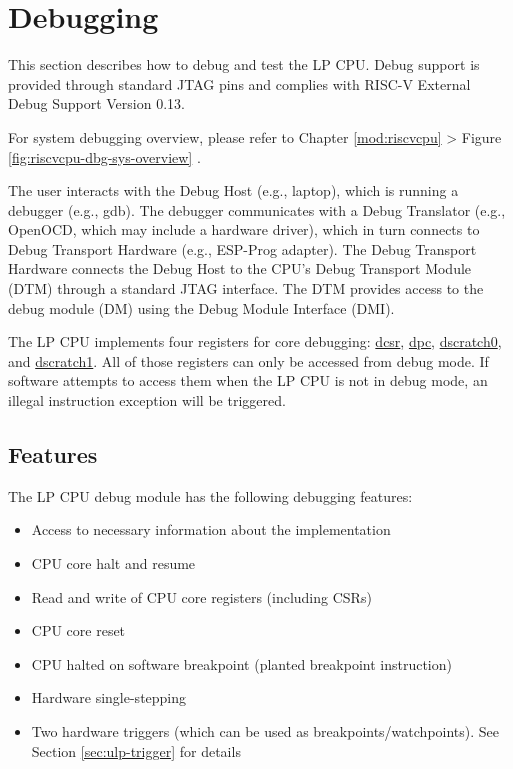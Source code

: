 \documentclass[main\_\_EN.tex]{subfiles}
\begin{document}
\section{Debugging}

This section describes how to debug and test the LP CPU. Debug support is provided through standard JTAG pins and complies with RISC-V External Debug Support Version 0.13.

For \chipname{} system debugging overview, please refer to Chapter \ref{mod:riscvcpu} \textit{} > Figure \ref{fig:riscvcpu-dbg-sys-overview} \textit{}.

The user interacts with the Debug Host (e.g., laptop), which is running a debugger (e.g., gdb). The debugger communicates with a Debug Translator (e.g., OpenOCD, which may include a hardware driver), which in turn connects to Debug Transport Hardware (e.g., ESP-Prog adapter). The Debug Transport Hardware connects the Debug Host to the CPU's Debug Transport Module (DTM) through a standard JTAG interface. The DTM provides access to the debug module (DM) using the Debug Module Interface (DMI).

The LP CPU implements four registers for core debugging: \hyperref[regdesc:LPDCSR]{dcsr}, \hyperref[regdesc:LPDPC]{dpc}, \hyperref[regdesc:LPDSCRATCH0]{dscratch0}, and \hyperref[regdesc:LPDSCRATCH1]{dscratch1}. All of those registers can only be accessed from debug mode. If software attempts to access them when the LP CPU is not in debug mode, an illegal instruction exception will be triggered.

\subsection{Features}
The LP CPU debug module has the following debugging features:
\begin{itemize}
    \item Access to necessary information about the implementation
    \item CPU core halt and resume
    \item Read and write of CPU core registers (including CSRs)
    \item CPU core reset
    \item CPU halted on software breakpoint (planted breakpoint instruction)
    \item Hardware single-stepping
    \item Two hardware triggers (which can be used as breakpoints/watchpoints). See Section \ref{sec:ulp-trigger} for details
\end{itemize}
\end{document}

